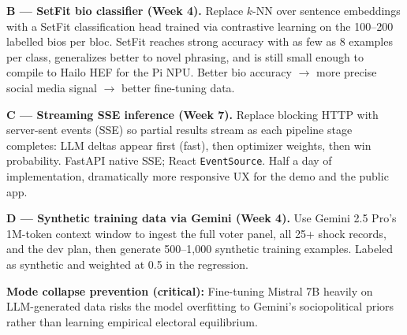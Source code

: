 \documentclass[11pt]{article}
\begin{document}
\textbf{B --- SetFit bio classifier (Week 4).}
Replace $k$-NN over sentence embeddings with a SetFit classification head trained
via contrastive learning on the 100--200 labelled bios per bloc. SetFit reaches
strong accuracy with as few as 8 examples per class, generalizes better to novel
phrasing, and is still small enough to compile to Hailo HEF for the Pi NPU.
Better bio accuracy $\to$ more precise social media signal $\to$ better fine-tuning data.

\textbf{C --- Streaming SSE inference (Week 7).}
Replace blocking HTTP with server-sent events (SSE) so partial results stream as
each pipeline stage completes: LLM deltas appear first (fast), then optimizer
weights, then win probability. FastAPI native SSE; React \texttt{EventSource}.
Half a day of implementation, dramatically more responsive UX for the demo and
the public app.

\textbf{D --- Synthetic training data via Gemini (Week 4).}
Use Gemini 2.5 Pro's 1M-token context window to ingest the full voter panel, all
25+ shock records, and the dev plan, then generate 500--1{,}000 synthetic training
examples. Labeled as synthetic and weighted at 0.5 in the regression.

\textbf{Mode collapse prevention (critical):} Fine-tuning Mistral 7B heavily on
LLM-generated data risks the model overfitting to Gemini's sociopolitical priors
rather than learning empirical electoral equilibrium.
\end{document}
